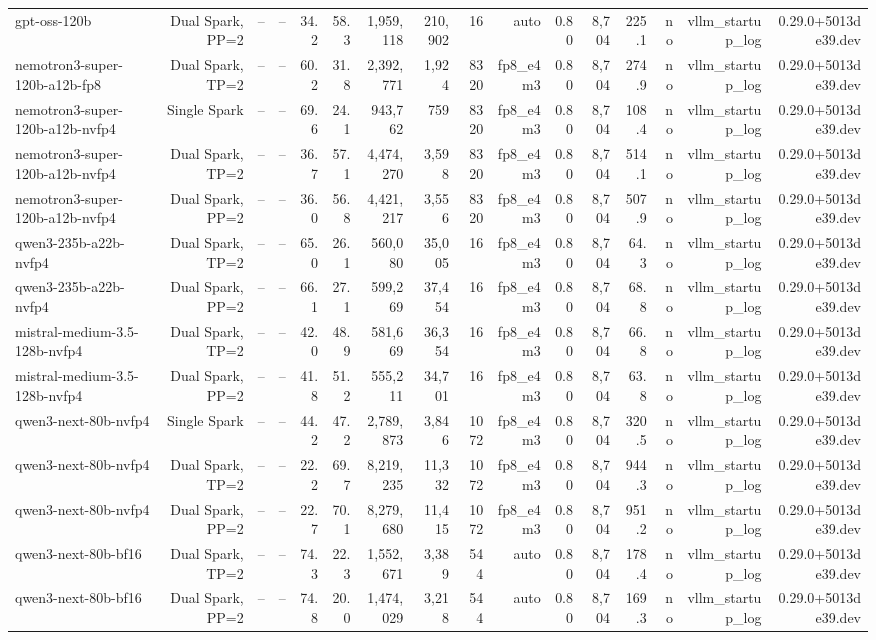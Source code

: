 \begin{tabular}{l r r r r r r r r r r r r r r r }
gpt-oss-120b & Dual Spark, PP=2 & -- & -- & 34.2 & 58.3 & 1,959,118 & 210,902 & 16 & auto & 0.80 & 8,704 & 225.1 & no & vllm\_startup\_log & 0.29.0+5013de39.dev \\
nemotron3-super-120b-a12b-fp8 & Dual Spark, TP=2 & -- & -- & 60.2 & 31.8 & 2,392,771 & 1,924 & 8320 & fp8\_e4m3 & 0.80 & 8,704 & 274.9 & no & vllm\_startup\_log & 0.29.0+5013de39.dev \\
nemotron3-super-120b-a12b-nvfp4 & Single Spark & -- & -- & 69.6 & 24.1 & 943,762 & 759 & 8320 & fp8\_e4m3 & 0.80 & 8,704 & 108.4 & no & vllm\_startup\_log & 0.29.0+5013de39.dev \\
nemotron3-super-120b-a12b-nvfp4 & Dual Spark, TP=2 & -- & -- & 36.7 & 57.1 & 4,474,270 & 3,598 & 8320 & fp8\_e4m3 & 0.80 & 8,704 & 514.1 & no & vllm\_startup\_log & 0.29.0+5013de39.dev \\
nemotron3-super-120b-a12b-nvfp4 & Dual Spark, PP=2 & -- & -- & 36.0 & 56.8 & 4,421,217 & 3,556 & 8320 & fp8\_e4m3 & 0.80 & 8,704 & 507.9 & no & vllm\_startup\_log & 0.29.0+5013de39.dev \\
qwen3-235b-a22b-nvfp4 & Dual Spark, TP=2 & -- & -- & 65.0 & 26.1 & 560,080 & 35,005 & 16 & fp8\_e4m3 & 0.80 & 8,704 & 64.3 & no & vllm\_startup\_log & 0.29.0+5013de39.dev \\
qwen3-235b-a22b-nvfp4 & Dual Spark, PP=2 & -- & -- & 66.1 & 27.1 & 599,269 & 37,454 & 16 & fp8\_e4m3 & 0.80 & 8,704 & 68.8 & no & vllm\_startup\_log & 0.29.0+5013de39.dev \\
mistral-medium-3.5-128b-nvfp4 & Dual Spark, TP=2 & -- & -- & 42.0 & 48.9 & 581,669 & 36,354 & 16 & fp8\_e4m3 & 0.80 & 8,704 & 66.8 & no & vllm\_startup\_log & 0.29.0+5013de39.dev \\
mistral-medium-3.5-128b-nvfp4 & Dual Spark, PP=2 & -- & -- & 41.8 & 51.2 & 555,211 & 34,701 & 16 & fp8\_e4m3 & 0.80 & 8,704 & 63.8 & no & vllm\_startup\_log & 0.29.0+5013de39.dev \\
qwen3-next-80b-nvfp4 & Single Spark & -- & -- & 44.2 & 47.2 & 2,789,873 & 3,846 & 1072 & fp8\_e4m3 & 0.80 & 8,704 & 320.5 & no & vllm\_startup\_log & 0.29.0+5013de39.dev \\
qwen3-next-80b-nvfp4 & Dual Spark, TP=2 & -- & -- & 22.2 & 69.7 & 8,219,235 & 11,332 & 1072 & fp8\_e4m3 & 0.80 & 8,704 & 944.3 & no & vllm\_startup\_log & 0.29.0+5013de39.dev \\
qwen3-next-80b-nvfp4 & Dual Spark, PP=2 & -- & -- & 22.7 & 70.1 & 8,279,680 & 11,415 & 1072 & fp8\_e4m3 & 0.80 & 8,704 & 951.2 & no & vllm\_startup\_log & 0.29.0+5013de39.dev \\
qwen3-next-80b-bf16 & Dual Spark, TP=2 & -- & -- & 74.3 & 22.3 & 1,552,671 & 3,389 & 544 & auto & 0.80 & 8,704 & 178.4 & no & vllm\_startup\_log & 0.29.0+5013de39.dev \\
qwen3-next-80b-bf16 & Dual Spark, PP=2 & -- & -- & 74.8 & 20.0 & 1,474,029 & 3,218 & 544 & auto & 0.80 & 8,704 & 169.3 & no & vllm\_startup\_log & 0.29.0+5013de39.dev \\
\bottomrule
\end{tabular}
